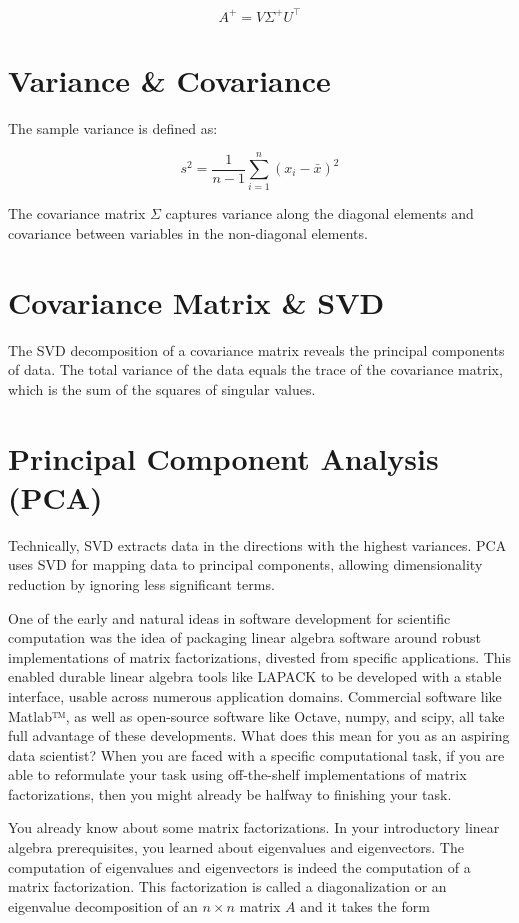 \documentclass{ximera}
\begin{document}
\[
A^+ = V \Sigma^+ U^\top
\]

\section{Variance \& Covariance}
The sample variance is defined as:

\[
s^2 = \frac{1}{n-1} \sum_{i=1}^n (x_i - \bar{x})^2
\]

The covariance matrix \(\Sigma\) captures variance along the diagonal elements and covariance between variables in the non-diagonal elements.

\section{Covariance Matrix \& SVD}
The SVD decomposition of a covariance matrix reveals the principal components of data. The total variance of the data equals the trace of the covariance matrix, which is the sum of the squares of singular values.

\section{Principal Component Analysis (PCA)}
Technically, SVD extracts data in the directions with the highest variances. PCA uses SVD for mapping data to principal components, allowing dimensionality reduction by ignoring less significant terms.

One of the early and natural ideas in software development for scientific computation was the idea of packaging linear algebra software around robust implementations of matrix factorizations, divested from specific applications. This enabled durable linear algebra tools like LAPACK to be developed with a stable interface, usable across numerous application domains. Commercial software like Matlab™, as well as open-source software like Octave, numpy, and scipy, all take full advantage of these developments. What does this mean for you as an aspiring data scientist? When you are faced with a specific computational task, if you are able to reformulate your task using off-the-shelf implementations of matrix factorizations, then you might already be halfway to finishing your task.

You already know about some matrix factorizations. In your introductory linear algebra prerequisites, you learned about eigenvalues and eigenvectors. The computation of eigenvalues and eigenvectors is indeed the computation of a matrix factorization. This factorization is called a diagonalization or an eigenvalue decomposition of an \( n \times n \) matrix \( A \) and it takes the form
\end{document}
